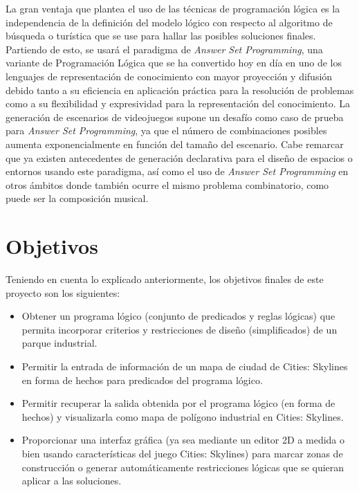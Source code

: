 La gran ventaja que plantea el uso de las técnicas de programación lógica es la independencia de la definición del modelo lógico con respecto al algoritmo de búsqueda o turística que se use para hallar las posibles soluciones finales. Partiendo de esto, se usará el paradigma de \textit{Answer Set Programming}, una variante de Programación Lógica que se ha convertido hoy en día en uno de los lenguajes de representación de conocimiento con mayor proyección y difusión debido tanto a su eficiencia en aplicación práctica para la resolución de problemas como a su flexibilidad y expresividad para la representación del conocimiento. La generación de escenarios de videojuegos supone un desafío como caso de prueba para \textit{Answer Set Programming}, ya que el número de combinaciones posibles aumenta exponencialmente en función del tamaño del escenario. Cabe remarcar que ya existen antecedentes de generación declarativa para el diseño de espacios o entornos \cite{desing} usando este paradigma, así como el uso de \textit{Answer Set Programming} en otros ámbitos donde también ocurre el mismo problema combinatorio, como puede ser la composición musical\cite{haspie}\cite{DBLP:journals/corr/abs-1006-4948}.

\section{Objetivos}

Teniendo en cuenta lo explicado anteriormente, los objetivos finales de este proyecto son los siguientes:

\begin{itemize}
	\item Obtener un programa lógico (conjunto de predicados y reglas lógicas) que permita incorporar criterios y restricciones de diseño (simplificados) de un parque industrial.
	\item Permitir la entrada de información de un mapa de ciudad de Cities: Skylines\textcopyright\xspace en forma de hechos para predicados del programa lógico.
	\item Permitir recuperar la salida obtenida por el programa lógico (en forma de hechos) y visualizarla como mapa de polígono industrial en Cities: Skylines\textcopyright.
	\item Proporcionar una interfaz gráfica (ya sea mediante un editor 2D a medida o bien usando características del juego Cities: Skylines\textcopyright) para marcar zonas de construcción o generar automáticamente restricciones lógicas que se quieran aplicar a las soluciones.
\end{itemize}


